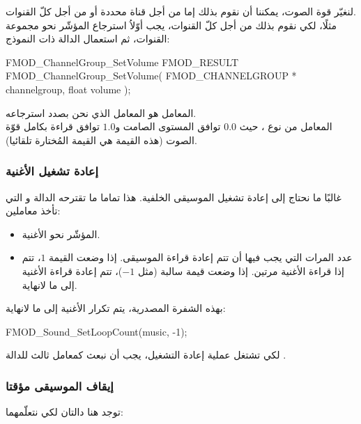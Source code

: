لنغيّر قوة الصوت، يمكننا أن نقوم بذلك إما من أجل قناة محددة أو من أجل كلّ القنوات.\\
مثلًا، لكي نقوم بذلك من أجل كلّ القنوات، يجب أوّلاُ استرجاع المؤشّر نحو مجموعة القنوات، ثم استعمال الدالة
ذات النموذج:

\begin{Csource}
FMOD_ChannelGroup_SetVolume 
FMOD_RESULT FMOD_ChannelGroup_SetVolume(
	FMOD_CHANNELGROUP *  channelgroup,  float  volume
);
\end{Csource}

المعامل
هو المعامل الذي نحن بصدد استرجاعه.\\
المعامل
من نوع
،
حيث $ 0.0 $ توافق المستوى الصامت و$ 1.0  $ توافق قراءة بكامل قوّة الصوت (هذه القيمة هي القيمة المُختارة تلقائيا).

\subsubsection{إعادة تشغيل الأغنية}

غالبًا ما نحتاج إلى إعادة تشغيل الموسيقى الخلفية. هذا تماما ما تقترحه الدالة
و التي تأخذ معاملين:

\begin{itemize}
	\item المؤشّر نحو الأغنية.
	\item عدد المرات التي يجب فيها أن تتم إعادة قراءة الموسيقى. إذا وضعت القيمة $ 1 $، تتم إذا قراءة الأغنية مرتين. إذا وضعت قيمة سالبة (مثل $ -1 $)، تتم إعادة قراءة الأغنية إلى ما لانهاية.
\end{itemize}

بهذه الشفرة المصدرية، يتم تكرار الأغنية إلى ما لانهاية: 

\begin{Csource}
FMOD_Sound_SetLoopCount(music, -1);
\end{Csource}

\begin{critical}
 لكي تشتغل عملية إعادة التشغيل، يجب أن نبعث 
 كمعامل ثالث للدالة
.
\end{critical}

\subsubsection{إيقاف الموسيقى مؤقتا}

توجد هنا دالتان لكي نتعلّمهما:


